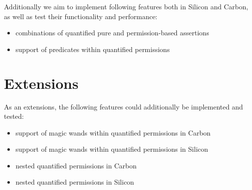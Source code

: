 \documentclass[12pt]{article}
\begin{document}
Additionally we aim to implement following features both in Silicon and Carbon, as well as test their functionality and performance:
\begin{itemize}
\item combinations of quantified pure and permission-based assertions
\item support of predicates within quantified permissions 
\end{itemize}

\section{Extensions}
As an extensions, the following features could additionally be implemented and tested:
\begin{itemize}
\item support of magic wands within quantified permissions in Carbon
\item support of magic wands within quantified permissions in Silicon
\item nested quantified permissions in Carbon 
\item nested quantified permissions in Silicon
\end{itemize}



\end{document}
